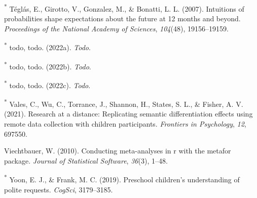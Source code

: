 \documentclass[
  man,floatsintext]{apa6}
\newlength{\cslhangindent}
\newlength{\cslentryspacingunit} %
\newenvironment{CSLReferences}[2] %
 {%
  \setlength{\parindent}{0pt}
  \ifodd #1
  \let\oldpar\par
  \def\par{\hangindent=\cslhangindent\oldpar}
  \fi
  \setlength{\parskip}{#2\cslentryspacingunit}
 }%
 {}
\begin{document}
\begin{CSLReferences}{1}{0}
\leavevmode{}%
\textsuperscript{*} Téglás, E., Girotto, V., Gonzalez, M., \& Bonatti, L. L. (2007). Intuitions of probabilities shape expectations about the future at 12 months and beyond. \emph{Proceedings of the National Academy of Sciences}, \emph{104}(48), 19156--19159.

\leavevmode{}%
\textsuperscript{*} todo, todo. (2022a). \emph{Todo}.

\leavevmode{}%
\textsuperscript{*} todo, todo. (2022b). \emph{Todo}.

\leavevmode{}%
\textsuperscript{*} todo, todo. (2022c). \emph{Todo}.

\leavevmode{}%
\textsuperscript{*} Vales, C., Wu, C., Torrance, J., Shannon, H., States, S. L., \& Fisher, A. V. (2021). Research at a distance: Replicating semantic differentiation effects using remote data collection with children participants. \emph{Frontiers in Psychology}, \emph{12}, 697550.

\leavevmode{}%
Viechtbauer, W. (2010). Conducting meta-analyses in r with the metafor package. \emph{Journal of Statistical Software}, \emph{36}(3), 1--48.

\leavevmode{}%
\textsuperscript{*} Yoon, E. J., \& Frank, M. C. (2019). Preschool children's understanding of polite requests. \emph{CogSci}, 3179--3185.

\end{CSLReferences}
\end{document}
